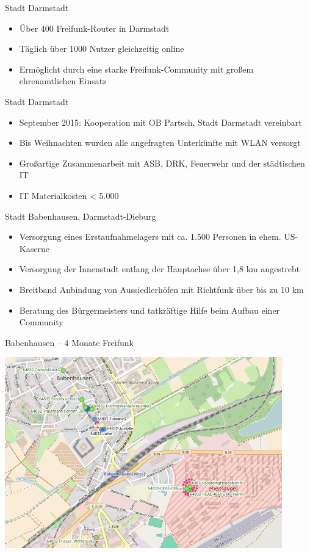 \documentclass[t]{beamer}
\begin{document}
  \begin{frame}{Stadt Darmstadt}
    \begin{itemize}
      \item Über 400 Freifunk-Router in Darmstadt
      \item Täglich über 1000 Nutzer gleichzeitig online
      \item Ermöglicht durch eine starke Freifunk-Community mit großem ehrenamtlichen Einsatz
    \end{itemize}
  \end{frame}

  \begin{frame}{Stadt Darmstadt}
    \begin{itemize}
      \item September 2015: Kooperation mit OB Partsch, Stadt Darmstadt vereinbart
      \item Bis Weihnachten wurden alle angefragten Unterkünfte mit WLAN versorgt
      \item Großartige Zusammenarbeit mit ASB, DRK, Feuerwehr und der städtischen IT
      \item IT Materialkosten < 5.000 \texteuro
    \end{itemize}
  \end{frame}

  \begin{frame}{Stadt Babenhausen, Darmstadt-Dieburg}
    \begin{itemize}
      \item Versorgung eines Erstaufnahmelagers mit ca. 1.500 Personen in ehem. US-Kaserne
      \item Versorgung der Innenstadt entlang der Hauptachse über 1,8 km angestrebt
      \item Breitband Anbindung von Aussiedlerhöfen mit Richtfunk über bis zu 10 km
      \item Beratung des Bürgermeisters und tatkräftige Hilfe beim Aufbau einer Community
    \end{itemize}
  \end{frame}

  \begin{frame}{Babenhausen – 4 Monate Freifunk}
    \begin{center}
      \includegraphics[width=0.9\textwidth]{images/2016-07-21-babenhausen}
    \end{center}
  \end{frame}
\end{document}

